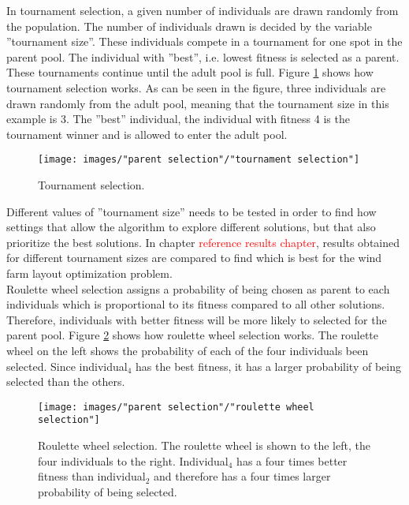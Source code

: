 \noindent In tournament selection, a given number of individuals are drawn randomly from the population. The number of individuals drawn is decided by the variable ''tournament size''. These individuals compete in a tournament for one spot in the parent pool. The individual with ''best'', i.e. lowest fitness is selected as a parent. These tournaments continue until the adult pool is full. Figure \ref{figure:tournament selection} shows how tournament selection works. As can be seen in the figure, three individuals are drawn randomly from the adult pool, meaning that the tournament size in this example is 3. The ''best'' individual, the individual with fitness 4 is the tournament winner and is allowed to enter the adult pool. \\


\begin{figure}[h!]
\begin{center}
\texttt{[image: images/"parent selection"/"tournament selection"]}
\caption{Tournament selection.}
\label{figure:tournament selection}
\end{center}
\end{figure}


\noindent Different values of ''tournament size'' needs to be tested in order to find how settings that allow the algorithm to explore different solutions, but that also prioritize the best solutions. In chapter \textcolor{red}{reference results chapter}, results obtained for different tournament sizes are compared to find which is best for the wind farm layout optimization problem. \\


\noindent Roulette wheel selection assigns a probability of being chosen as parent to each individuals which is proportional to its fitness compared to all other solutions. Therefore, individuals with better fitness will be more likely to selected for the parent pool. Figure \ref{figure:roulette wheel selection} shows how roulette wheel selection works. The roulette wheel on the left shows the probability of each of the four individuals been selected. Since individual$_4$ has the best fitness, it has a larger probability of being selected than the others. \\


\begin{figure}[h!]
\begin{center}
\texttt{[image: images/"parent selection"/"roulette wheel selection"]}
\caption{Roulette wheel selection. The roulette wheel is shown to the left, the four individuals to the right. Individual$_4$ has a four times better fitness than individual$_2$ and therefore has a four times larger probability of being selected.}
\label{figure:roulette wheel selection}
\end{center}
\end{figure}


